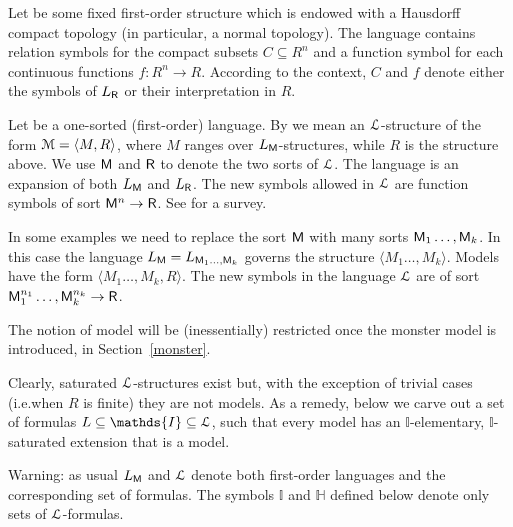 \documentclass[11pt,oneside]{amsart}
\renewcommand*{\emph}[1]{%
   \smash{\tikz[baseline]\node[rectangle, fill=teal!25, rounded corners, inner xsep=0.5ex, inner ysep=0.2ex, anchor=base, minimum height = 2.7ex]{#1};}}
\begin{document}
Let \emph{$R$\/} be some fixed first-order structure which is endowed with a Hausdorff compact topology (in particular, a normal topology).
The language \emph{$L_{\sf R}$\/} contains relation symbols for the compact subsets $C\subseteq R^n$ and a function symbol for each continuous functions $f:R^n\to R$.
According to the context, $C$ and $f$ denote either the symbols of $L_{\sf R}$ or their interpretation in $R$.


\begin{definition}\label{def_0}
  Let \emph{$L_{\sf M}$\/} be a one-sorted (first-order) language.
  By \emph{model\/} we mean an ${\EuScript L}$-structure of the form ${\EuScript M}=\langle  M,R\rangle$, where $M$ ranges over $L_{\sf M}$-structures, while $R$ is the structure above.
  We use ${\sf M}$ and ${\sf R}$ to denote the two sorts of ${\EuScript L}$.
  The language \emph{${\EuScript L}$\/} is an expansion of both $L_{\sf M}$ and $L_{\sf R}$.
  The new symbols allowed in ${\EuScript L}$ are function symbols of sort ${\sf M}^n\to {\sf R}$.
  See \cite[k]{K} for a survey. 
\end{definition}

In some examples we need to replace the sort ${\sf M}$ with many sorts ${\sf M}_1\dots,{\sf M}_k$.
In this case the language $L_{\sf M}=L_{{\sf M}_1\dots,{\sf M}_k}$ governs the structure $\langle M_1\dots,M_k\rangle$.
Models have the form $\langle M _1\dots,M_k, R\rangle$.
The new symbols in the language ${\EuScript L}$ are of sort ${\sf M}_1^{n_1}\dots,{\sf M}_k^{n_k}\to {\sf R}$.

The notion of model will be (inessentially) restricted once the monster model is introduced, in Section~\ref{monster}.

Clearly, saturated ${\EuScript L}$-structures exist but, with the exception of trivial cases (i.e.\@ when $R$ is finite) they are not models.
As a remedy, below we carve out a set of formulas $L\subseteq\mathds{I}\subseteq {\EuScript L}$, such that every model has an $\mathds{I}$-elementary, $\mathds{I}$-saturated extension that is a model.

Warning: as usual $L_{\sf M}$ and ${\EuScript L}$ denote both first-order languages and the corresponding set of formulas.
The symbols $\mathds{I}$ and $\mathds{H}$ defined below denote only sets of ${\EuScript L}$-formulas.
\end{document}
